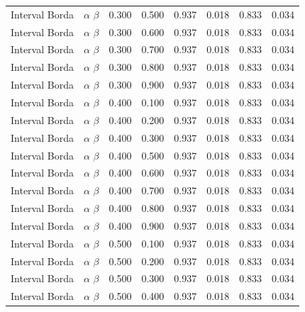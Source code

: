 \begin{longtable}{lccccccc}
Interval Borda & $\alpha$ $\beta$ & 0.300 & 0.500 & 0.937 & 0.018 & 0.833 & 0.034 \\
Interval Borda & $\alpha$ $\beta$ & 0.300 & 0.600 & 0.937 & 0.018 & 0.833 & 0.034 \\
Interval Borda & $\alpha$ $\beta$ & 0.300 & 0.700 & 0.937 & 0.018 & 0.833 & 0.034 \\
Interval Borda & $\alpha$ $\beta$ & 0.300 & 0.800 & 0.937 & 0.018 & 0.833 & 0.034 \\
Interval Borda & $\alpha$ $\beta$ & 0.300 & 0.900 & 0.937 & 0.018 & 0.833 & 0.034 \\
Interval Borda & $\alpha$ $\beta$ & 0.400 & 0.100 & 0.937 & 0.018 & 0.833 & 0.034 \\
Interval Borda & $\alpha$ $\beta$ & 0.400 & 0.200 & 0.937 & 0.018 & 0.833 & 0.034 \\
Interval Borda & $\alpha$ $\beta$ & 0.400 & 0.300 & 0.937 & 0.018 & 0.833 & 0.034 \\
Interval Borda & $\alpha$ $\beta$ & 0.400 & 0.500 & 0.937 & 0.018 & 0.833 & 0.034 \\
Interval Borda & $\alpha$ $\beta$ & 0.400 & 0.600 & 0.937 & 0.018 & 0.833 & 0.034 \\
Interval Borda & $\alpha$ $\beta$ & 0.400 & 0.700 & 0.937 & 0.018 & 0.833 & 0.034 \\
Interval Borda & $\alpha$ $\beta$ & 0.400 & 0.800 & 0.937 & 0.018 & 0.833 & 0.034 \\
Interval Borda & $\alpha$ $\beta$ & 0.400 & 0.900 & 0.937 & 0.018 & 0.833 & 0.034 \\
Interval Borda & $\alpha$ $\beta$ & 0.500 & 0.100 & 0.937 & 0.018 & 0.833 & 0.034 \\
Interval Borda & $\alpha$ $\beta$ & 0.500 & 0.200 & 0.937 & 0.018 & 0.833 & 0.034 \\
Interval Borda & $\alpha$ $\beta$ & 0.500 & 0.300 & 0.937 & 0.018 & 0.833 & 0.034 \\
Interval Borda & $\alpha$ $\beta$ & 0.500 & 0.400 & 0.937 & 0.018 & 0.833 & 0.034 \\
\end{longtable}
